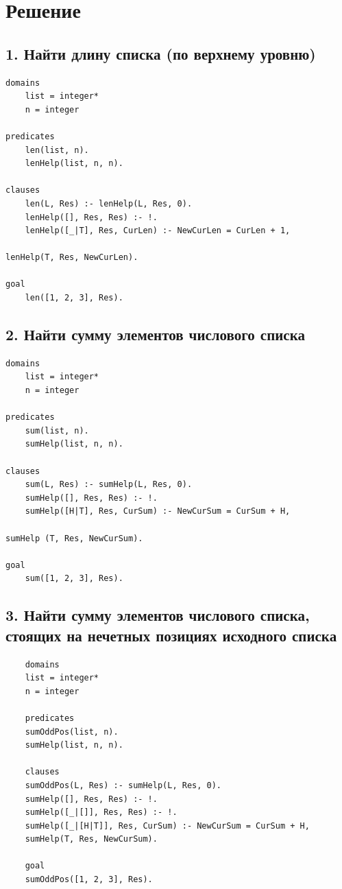 \documentclass[12pt]{report}
\begin{document}
	\section*{Решение}
	\subsection*{1. Найти длину списка (по верхнему уровню)}
	\begin{lstlisting}	
domains
	list = integer*
	n = integer
	
predicates
	len(list, n).
	lenHelp(list, n, n).
	
clauses
	len(L, Res) :- lenHelp(L, Res, 0).
	lenHelp([], Res, Res) :- !.
	lenHelp([_|T], Res, CurLen) :- NewCurLen = CurLen + 1, 
															   lenHelp(T, Res, NewCurLen).

goal
	len([1, 2, 3], Res).
	\end{lstlisting}
	\clearpage
	\subsection*{2. Найти сумму элементов числового списка}
	\begin{lstlisting}	
domains
	list = integer*
	n = integer
	
predicates
	sum(list, n).
	sumHelp(list, n, n).
	
clauses
	sum(L, Res) :- sumHelp(L, Res, 0).
	sumHelp([], Res, Res) :- !.
	sumHelp([H|T], Res, CurSum) :- NewCurSum = CurSum + H, 
																 sumHelp (T, Res, NewCurSum).
	
goal
	sum([1, 2, 3], Res).
	\end{lstlisting}

\subsection*{3. Найти сумму элементов числового списка, стоящих на нечетных позициях исходного списка}
\begin{lstlisting}	
	domains
	list = integer*
	n = integer
	
	predicates
	sumOddPos(list, n).
	sumHelp(list, n, n).
	
	clauses
	sumOddPos(L, Res) :- sumHelp(L, Res, 0).
	sumHelp([], Res, Res) :- !.
	sumHelp([_|[]], Res, Res) :- !.
	sumHelp([_|[H|T]], Res, CurSum) :- NewCurSum = CurSum + H, 
	sumHelp(T, Res, NewCurSum).
	
	goal
	sumOddPos([1, 2, 3], Res).
\end{lstlisting}
\clearpage
\end{document}
